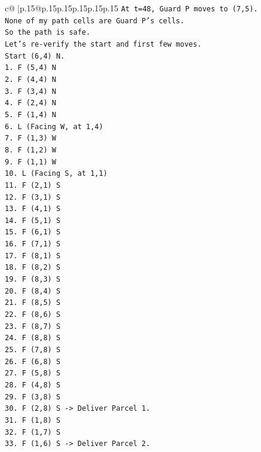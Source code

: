 \documentclass{article}
\begin{document}
{\begin{supertabular}{c@{$\;$}|p{.15\linewidth}@{}p{.15\linewidth}p{.15\linewidth}p{.15\linewidth}p{.15\linewidth}p{.15\linewidth}}
{{{\texttt{At t=48, Guard P moves to (7,5).} \\
\texttt{None of my path cells are Guard P's cells.} \\
\texttt{So the path is safe.} \\
\texttt{Let's re{-}verify the start and first few moves.} \\
\texttt{Start (6,4) N.} \\
\texttt{1. F (5,4) N} \\
\texttt{2. F (4,4) N} \\
\texttt{3. F (3,4) N} \\
\texttt{4. F (2,4) N} \\
\texttt{5. F (1,4) N} \\
\texttt{6. L (Facing W, at 1,4)} \\
\texttt{7. F (1,3) W} \\
\texttt{8. F (1,2) W} \\
\texttt{9. F (1,1) W} \\
\texttt{10. L (Facing S, at 1,1)} \\
\texttt{11. F (2,1) S} \\
\texttt{12. F (3,1) S} \\
\texttt{13. F (4,1) S} \\
\texttt{14. F (5,1) S} \\
\texttt{15. F (6,1) S} \\
\texttt{16. F (7,1) S} \\
\texttt{17. F (8,1) S} \\
\texttt{18. F (8,2) S} \\
\texttt{19. F (8,3) S} \\
\texttt{20. F (8,4) S} \\
\texttt{21. F (8,5) S} \\
\texttt{22. F (8,6) S} \\
\texttt{23. F (8,7) S} \\
\texttt{24. F (8,8) S} \\
\texttt{25. F (7,8) S} \\
\texttt{26. F (6,8) S} \\
\texttt{27. F (5,8) S} \\
\texttt{28. F (4,8) S} \\
\texttt{29. F (3,8) S} \\
\texttt{30. F (2,8) S {-}> Deliver Parcel 1.} \\
\texttt{31. F (1,8) S} \\
\texttt{32. F (1,7) S} \\
\texttt{33. F (1,6) S {-}> Deliver Parcel 2.} \\
}}}
\end{supertabular}}
\end{document}
